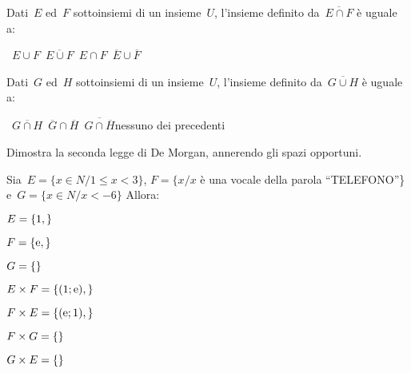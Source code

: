 \begin{esercizio}
 \label{ese:7.16}
Dati~$E$ ed~$F$ sottoinsiemi di un insieme~$U$, l'insieme
definito da~$\overline{E\cap F}$ è uguale a:
\begin{center}
\boxA\quad~$E\cup F$\quad\boxB\quad~$\overline{E\cup F}$\quad\boxC\quad~$E\cap 
F$\quad\boxD\quad~$\overline{E}\cup\overline{F}$
\end{center}
\end{esercizio}

\begin{esercizio}
 \label{ese:7.17}
Dati~$G$ ed~$H$ sottoinsiemi di un insieme~$U$, l'insieme
definito da~$\overline{G\cup H}$ è uguale a:
\begin{center}
\boxA\quad~$\overline{{G\cap 
H}}$\quad\boxB\quad~$\overline{G}\cap\overline{H}$\quad\boxC\quad~$\overline{{
G\cap \overline{H}}}$\quad\boxD\quad nessuno dei precedenti
\end{center}
\end{esercizio}


\begin{esercizio}
 \label{ese:7.18}
 Dimostra la seconda legge di De Morgan, annerendo gli spazi opportuni.
 \begin{center}
 
 \end{center}
\end{esercizio}


\begin{esercizio}
\label{ese:7.19}
Sia~$E=\{x\in N/1\le x<3\}$, $F=\{x/x$ è una vocale della parola ``TELEFONO''\} 
e~$G=\{x\in N/x<-6\}$ Allora:
\begin{enumeratea}
 \item $E=\{1,\dotfill \}$
 \item $F=\{\text{e},\dotfill\}$
 \item $G=\{\dotfill\}$
 \item $E\times F=\{(1;\text{e}),\dotfill\}$
 \item $F\times E=\{(\text{e};1),\dotfill\}$
 \item $F\times G=\{\dotfill\}$
 \item $G\times E=\{\dotfill\}$
\end{enumeratea}
\end{esercizio}


